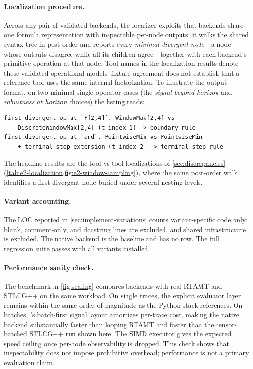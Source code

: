 \paragraph{Localization procedure.}
Across any pair of validated backends, the localizer exploits that \tool
backends share one formula representation with inspectable per-node outputs:
it walks the shared syntax tree in post-order and reports every \emph{minimal
divergent node}---a node whose outputs disagree while all its children
agree---together with each backend's primitive operation at that node.
Tool names in the localization results denote these validated operational
models; fixture agreement does not establish that a reference tool uses the
same internal factorization. To
illustrate the output format, on two minimal single-operator cases (the
\emph{signal beyond horizon} and \emph{robustness at horizon} choices) the
listing reads:
\begin{lstlisting}[language={},keywordstyle={},basicstyle=\footnotesize\ttfamily]
first divergent op at `F[2,4]`: WindowMax[2,4] vs
    DiscreteWindowMax[2,4] (t-index 1) -> boundary rule
first divergent op at `and`: PointwiseMin vs PointwiseMin
    + terminal-step extension (t-index 2) -> terminal-step rule
\end{lstlisting}
The headline results are the tool-vs-tool localizations of
\cref{sec:discrepancies} (\cref{tab:e2-localization,fig:e2-window-sampling}),
where the same post-order walk identifies a first divergent node buried under
several nesting levels.

\paragraph{Variant accounting.}
The LOC reported in \cref{sec:implement-variations} counts variant-specific code only: blank,
comment-only, and docstring lines are excluded, and shared infrastructure is
excluded. The native backend is the baseline and has no row. The full regression
suite passes with all variants installed.

\paragraph{Performance sanity check.}
The benchmark in \cref{fig:scaling} compares \tool backends with real RTAMT and STLCG++ on
the same workload. On single traces, the explicit evaluator layer remains
within the same order of magnitude as the Python-stack references. On
batches, \tool's batch-first signal layout amortizes per-trace cost, making
the native backend substantially faster than looping RTAMT and faster than
the tensor-batched STLCG++ run shown here. The SIMD executor gives the
expected speed ceiling once per-node observability is dropped. This check
shows that inspectability does not impose prohibitive overhead; performance
is not a primary evaluation claim.

